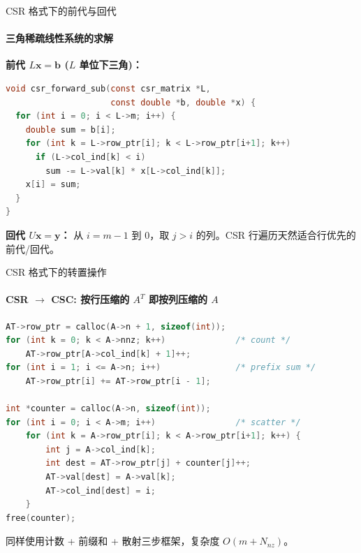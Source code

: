 \documentclass[12pt,aspectratio=169]{beamer}
\begin{document}
\begin{frame}[fragile]{CSR 格式下的前代与回代}
\framesubtitle{三角稀疏线性系统的求解}

\footnotesize
\textbf{前代 $L\mathbf{x}=\mathbf{b}$ ($L$ 单位下三角)：}
\vspace{-4pt}
\begin{lstlisting}[language=C,basicstyle=\ttfamily\scriptsize,aboveskip=2pt,belowskip=2pt]
void csr_forward_sub(const csr_matrix *L,
                     const double *b, double *x) {
  for (int i = 0; i < L->m; i++) {
    double sum = b[i];
    for (int k = L->row_ptr[i]; k < L->row_ptr[i+1]; k++)
      if (L->col_ind[k] < i)
        sum -= L->val[k] * x[L->col_ind[k]];
    x[i] = sum;
  }
}
\end{lstlisting}

\vspace{2pt}
\textbf{回代 $U\mathbf{x}=\mathbf{y}$：} 从 $i=m-1$ 到 $0$，取 $j>i$ 的列。CSR 行遍历天然适合行优先的前代/回代。
\end{frame}

\begin{frame}[fragile]{CSR 格式下的转置操作}
\framesubtitle{CSR $\to$ CSC: 按行压缩的 $A^T$ 即按列压缩的 $A$}

\scriptsize
\begin{lstlisting}[language=C,basicstyle=\ttfamily\scriptsize,belowskip=-4pt]
AT->row_ptr = calloc(A->n + 1, sizeof(int));
for (int k = 0; k < A->nnz; k++)              /* count */
    AT->row_ptr[A->col_ind[k] + 1]++;
for (int i = 1; i <= A->n; i++)               /* prefix sum */
    AT->row_ptr[i] += AT->row_ptr[i - 1];

int *counter = calloc(A->n, sizeof(int));
for (int i = 0; i < A->m; i++)                /* scatter */
    for (int k = A->row_ptr[i]; k < A->row_ptr[i+1]; k++) {
        int j = A->col_ind[k];
        int dest = AT->row_ptr[j] + counter[j]++;
        AT->val[dest] = A->val[k];
        AT->col_ind[dest] = i;
    }
free(counter);
\end{lstlisting}

\vspace{2pt}
\footnotesize
同样使用计数 + 前缀和 + 散射三步框架，复杂度 $O(m+N_{\!nz})$。
\end{frame}
\end{document}
